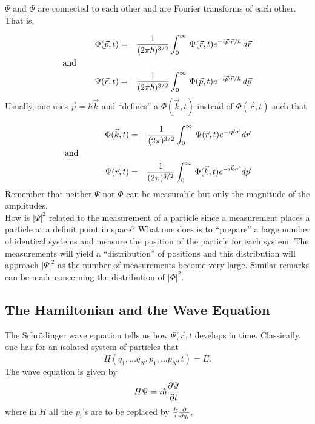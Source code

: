 $\Psi$ and $\Phi$ are connected to each other and are Fourier transforms of each other. That is, 

 \begin{eqnarray*}
  \Phi(\vec{p},t) &=& {1\over (2\pi\hbar)^{3/2}} \int_0^\infty \, \Psi(\vec{r},t)e^{-i\vec{p}\cdot\vec{r}/\hbar}\, d\vec{r} \\ 
  \hbox{and~~~~~~~~~~~~~~~\hfill} &\null&\\
  \Psi(\vec{r},t) &=& {1\over (2\pi\hbar)^{3/2}} \int_0^\infty \, \Phi(\vec{p},t)e^{-i\vec{p}\cdot\vec{r}/\hbar}\, d\vec{p} 
 \end{eqnarray*}Usually, one uses $\vec{p} = \hbar\vec{k}$ and ``defines'' a $\Phi(\vec{k},t)$ instead of $\Phi(\vec{r},t)$ such that 
  
 \begin{eqnarray*}
  \Phi(\vec{k},t) &=& {1\over (2\pi)^{3/2}} \int_0^\infty \, \Psi(\vec{r},t)e^{-i\vec{p}\cdot\vec{r}}\, d\vec{r} \\ 
  \hbox{and~~~~~~~~~~~~~~~~~~\hfill} &\null&\\
  \Psi(\vec{r},t) &=& {1\over (2\pi)^{3/2}} \int_0^\infty \, \Phi(\vec{k},t)e^{-i\vec{k}\cdot\vec{r}}\, d\vec{p} 
 \end{eqnarray*}Remember that neither $\Psi$ nor $\Phi$ can be measurable but only the magnitude of the amplitudes.\\
 
 How is $|\Psi|^2$ related to the measurement of a particle since a measurement places a particle at a definit point in space? What one does is to 
 ``prepare'' a large number of identical systems and measure the position of the particle for each system. The measurements will yield a ``distribution'' of
 positions and this distribution will approach $|\Psi|^2$ as the number of measurements become very large. Similar remarks can be made concerning
 the distribution of $|\Phi|^2$. \\
 
 \subsection{The Hamiltonian and the Wave Equation}
 The Schr\"odinger wave equation tells us how $\Psi(\vec{r},t$ develops in time. Classically, one has for an isolated system of particles that 
 $$H(q_1,...q_N,p_1,...p_N,t) = E.$$ The wave equation is given by $$H\Psi = i\hbar{\partial \Psi\over \partial t}$$ where in $H$ all the $p_i$'s are to be
 replaced by ${\hbar\over i}{\partial\over \partial q_i}$.\\
 
